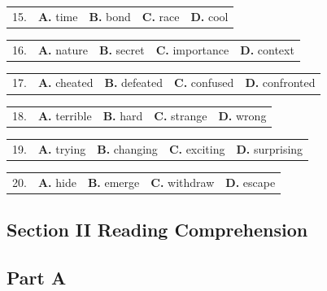 \documentclass[UTF8,11pt]{ctexart}
\begin{document}
\noindent\begin{tabularx}{\linewidth}{@{}lXXXX@{}}15. & \textbf{A.} time & \textbf{B.} bond & \textbf{C.} race & \textbf{D.} cool\\\end{tabularx}\par

\noindent\begin{tabularx}{\linewidth}{@{}lXXXX@{}}16. & \textbf{A.} nature & \textbf{B.} secret & \textbf{C.} importance & \textbf{D.} context\\\end{tabularx}\par

\noindent\begin{tabularx}{\linewidth}{@{}lXXXX@{}}17. & \textbf{A.} cheated & \textbf{B.} defeated & \textbf{C.} confused & \textbf{D.} confronted\\\end{tabularx}\par

\noindent\begin{tabularx}{\linewidth}{@{}lXXXX@{}}18. & \textbf{A.} terrible & \textbf{B.} hard & \textbf{C.} strange & \textbf{D.} wrong\\\end{tabularx}\par

\noindent\begin{tabularx}{\linewidth}{@{}lXXXX@{}}19. & \textbf{A.} trying & \textbf{B.} changing & \textbf{C.} exciting & \textbf{D.} surprising\\\end{tabularx}\par

\noindent\begin{tabularx}{\linewidth}{@{}lXXXX@{}}20. & \textbf{A.} hide & \textbf{B.} emerge & \textbf{C.} withdraw & \textbf{D.} escape\\\end{tabularx}\par

\subsection*{\textbf{Section II Reading Comprehension}}


\subsection*{\textbf{Part A}}
\end{document}

